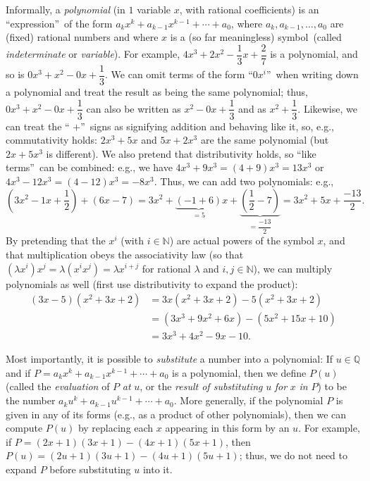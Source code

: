 \documentclass[numbers=enddot,12pt,final,onecolumn,notitlepage]{scrartcl}%
\numberwithin{exer}{subsection}
\theoremstyle{definition}
\begin{document}
Informally, a \textit{polynomial} (in $1$ variable $x$, with rational
coefficients) is an \textquotedblleft expression\textquotedblright\ of the
form $a_{k}x^{k}+a_{k-1}x^{k-1}+\cdots+a_{0}$, where $a_{k},a_{k-1}%
,\ldots,a_{0}$ are (fixed) rational numbers and where $x$ is a (so far
meaningless) symbol\ (called \textit{indeterminate} or \textit{variable}). For
example, $4x^{3}+2x^{2}-\dfrac{1}{3}x+\dfrac{2}{7}$ is a polynomial, and so is
$0x^{3}+x^{2}-0x+\dfrac{1}{3}$. We can omit terms of the form
\textquotedblleft$0x^{i}$\textquotedblright\ when writing down a polynomial
and treat the result as being the same polynomial; thus, $0x^{3}%
+x^{2}-0x+\dfrac{1}{3}$ can also be written as $x^{2}-0x+\dfrac{1}{3}$ and as
$x^{2}+\dfrac{1}{3}$. Likewise, we can treat the \textquotedblleft%
$+$\textquotedblright\ signs as signifying addition and behaving like it, so,
e.g., commutativity holds: $2x^{3}+5x$ and $5x+2x^{3}$ are the same polynomial
(but $2x+5x^{3}$ is different). We also pretend that distributivity holds, so
\textquotedblleft like terms\textquotedblright\ can be combined: e.g., we have
$4x^{3}+9x^{3}=\left(  4+9\right)  x^{3}=13x^{3}$ or $4x^{3}-12x^{3}=\left(
4-12\right)  x^{3}=-8x^{3}$. Thus, we can add two polynomials: e.g.,%
\[
\left(  3x^{2}-1x+\dfrac{1}{2}\right)  +\left(  6x-7\right)  =3x^{2}%
+\underbrace{\left(  -1+6\right)  }_{=5}x+\underbrace{\left(  \dfrac{1}%
{2}-7\right)  }_{=\dfrac{-13}{2}}=3x^{2}+5x+\dfrac{-13}{2}.
\]
By pretending that the $x^{i}$ (with $i\in\mathbb{N}$) are actual powers of
the symbol $x$, and that multiplication obeys the associativity law (so that
$\left(  \lambda x^{i}\right)  x^{j}=\lambda\left(  x^{i}x^{j}\right)
=\lambda x^{i+j}$ for rational $\lambda$ and $i,j\in\mathbb{N}$), we can
multiply polynomials as well (first use distributivity to expand the product):%
\begin{align*}
\left(  3x-5\right)  \left(  x^{2}+3x+2\right)   &  =3x\left(  x^{2}%
+3x+2\right)  -5\left(  x^{2}+3x+2\right) \\
&  =\left(  3x^{3}+9x^{2}+6x\right)  -\left(  5x^{2}+15x+10\right) \\
&  =3x^{3}+4x^{2}-9x-10.
\end{align*}


Most importantly, it is possible to \textit{substitute} a number into a
polynomial: If $u\in\mathbb{Q}$ and if $P=a_{k}x^{k}+a_{k-1}x^{k-1}%
+\cdots+a_{0}$ is a polynomial, then we define $P\left(  u\right)  $ (called
the \textit{evaluation} of $P$ \textit{at} $u$, or the \textit{result of
substituting }$u$ \textit{for }$x$ \textit{in} $P$) to be the number
$a_{k}u^{k}+a_{k-1}u^{k-1}+\cdots+a_{0}$. More generally, if the polynomial
$P$ is given in any of its forms (e.g., as a product of other polynomials),
then we can compute $P\left(  u\right)  $ by replacing each $x$ appearing in
this form by an $u$. For example, if $P=\left(  2x+1\right)  \left(
3x+1\right)  -\left(  4x+1\right)  \left(  5x+1\right)  $, then $P\left(
u\right)  =\left(  2u+1\right)  \left(  3u+1\right)  -\left(  4u+1\right)
\left(  5u+1\right)  $; thus, we do not need to expand $P$ before substituting
$u$ into it.
\end{document}
